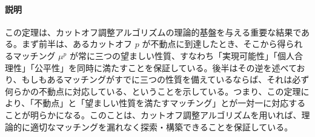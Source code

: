\documentclass[12pt, a4paper]{article}
\theoremstyle{definition}
\theoremstyle{remark}
\theoremstyle{plain}
\begin{document}
\paragraph{説明}
この定理は、カットオフ調整アルゴリズムの理論的基盤を与える重要な結果である。まず前半は、あるカットオフ $p$ が不動点に到達したとき、そこから得られるマッチング $\mu^p$ が常に三つの望ましい性質、すなわち「実現可能性」「個人合理性」「公平性」を同時に満たすことを保証している。後半はその逆を述べており、もしもあるマッチングがすでに三つの性質を備えているならば、それは必ず何らかの不動点に対応している、ということを示している。つまり、この定理により、「不動点」と「望ましい性質を満たすマッチング」とが一対一に対応することが明らかになる。このことは、カットオフ調整アルゴリズムを用いれば、理論的に適切なマッチングを漏れなく探索・構築できることを保証している。








    

\end{document}
